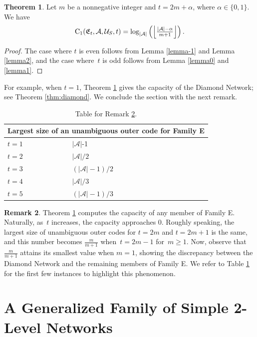 \documentclass[11pt,a4paper]{article}
\theoremstyle{definition}
\newtheorem{theorem}{Theorem}[section]
\newtheorem{remark}[theorem]{Remark}
\newcommand{\mA}{\mathcal{A}}
\newcommand{\mU}{\mathcal{U}}
\newcommand{\CC}{\textnormal{C}}
\begin{document}
\begin{theorem}
\label{thm:familyE}
Let $m$ be a nonnegative integer and $t=2m + \alpha$, where $\alpha \in \{0,1\}$. We have
$$\CC_1(\mathfrak{E}_t,\mA,\mU_S,t) =  \log_{|\mA|}\left(\left\lfloor\tfrac{|\mA|-\alpha}{m+1}\right\rfloor\right).$$
\end{theorem}
\begin{proof}
The case where $t$ is even follows from Lemma \ref{lemma-1} and Lemma \ref{lemma2}, and the case where~$t$ is odd follows from Lemma \ref{lemma0} and \ref{lemma1}.   
\end{proof}
For example, when $t=1$, Theorem \ref{thm:familyE} gives the capacity of the Diamond Network; see Theorem \ref{thm:diamond}. We conclude the section with the next remark.

\begin{table}[h!]
\centering
\begin{tabular}{ |p{4cm}|p{2cm}|  }
\hline
\multicolumn{2}{|c|}{Largest size of an unambiguous outer code for Family E} \\
\hline \hline
$t=1$ & $\lvert \mA \rvert$-1 \\
\hline
$t=2$ & $\lvert \mA \rvert/2$ \\
\hline
$t=3$ & $(\lvert \mA \rvert-1)/2$ \\
\hline
$t=4$ & $\lvert \mA \rvert/3$ \\
\hline
$t=5$ & $(\lvert \mA \rvert-1)/3$ \\
\hline
\end{tabular}
\caption{Table for Remark \ref{rem:familE}.}
\label{tab:diam}
\end{table}



\begin{remark}
\label{rem:familE}
Theorem \ref{thm:familyE} computes the capacity of any member of Family E. Naturally, as~$t$ increases, the capacity approaches 0. 
Roughly speaking, the largest size of unambiguous outer codes for $t=2m$ and $t=2m+1$ is the same, and this number becomes $\frac{m}{m+1}$ when~$t=2m-1$ for~$m \ge 1$. Now, observe that $\frac{m}{m+1}$ attains its smallest value when $m=1$, showing the  discrepancy between the Diamond Network and the remaining members of Family E.
We refer to Table \ref{tab:diam} for the first few instances to highlight this phenomenon. 
\end{remark}




\section{A Generalized Family of Simple 2-Level Networks}
\label{sec:newfamily}
\end{document}
